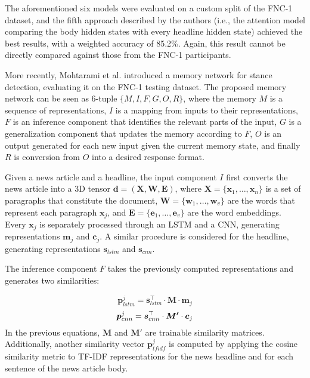 The aforementioned six models were evaluated on a custom split of the FNC-1 dataset, and the fifth approach described by the authors (i.e., the attention model comparing the body hidden states with every headline hidden state) achieved the best results, with a weighted accuracy of 85.2\%. Again, this result cannot be directly compared against those from the FNC-1 participants.

More recently, Mohtarami et al. \cite{Mohtarami2018} introduced a memory network for stance detection, evaluating it on the FNC-1 testing dataset. The proposed memory network can be seen as 6-tuple $\{M, I, F, G, O, R\}$, where the memory $M$ is a sequence of representations, $I$ is a mapping from inputs to their representations, $F$ is an inference component that identifies the relevant parts of the input, $G$ is a generalization component that updates the memory according to $F$, $O$ is an output generated for each new input given the current memory state, and finally  $R$ is conversion from $O$ into a desired response format.

Given a news article and a headline, the input component $I$ first converts the news article into a 3D tensor $\boldsymbol{d} = (\boldsymbol{X}, \boldsymbol{W}, \boldsymbol{E})$, where $\boldsymbol{X} = \{\boldsymbol{x}_1, \dots, \boldsymbol{x}_n\}$ is a set of paragraphs that constitute the document, $\boldsymbol{W} = \{\boldsymbol{w}_1, \dots, \boldsymbol{w}_v\}$ are the words that represent each paragraph $\boldsymbol{x}_j$, and $\boldsymbol{E} = \{\boldsymbol{e}_1, \dots, \boldsymbol{e}_v\}$ are the word embeddings. Every $\boldsymbol{x}_j$ is separately processed through an LSTM and a CNN, generating representations $\boldsymbol{m}_j$ and $\boldsymbol{c}_j$. A similar procedure is considered for the headline, generating representations $\boldsymbol{s}_{lstm}$ and $\boldsymbol{s}_{cnn}$.

The inference component $F$ takes the previously computed representations and generates two similarities:

\begin{equation}
\boldsymbol{p}^j_{lstm} = \boldsymbol{s}_{lstm}^\top \cdot \boldsymbol{M} \cdot \boldsymbol{m}_j
\end{equation}
\begin{equation}
\boldsymbol{p}^j_{cnn} = \boldsymbol{s}_{cnn}^\top \cdot \boldsymbol{M'} \cdot \boldsymbol{c}_j\\
\label{eq:sims}
\end{equation}
In the previous equations, $\boldsymbol{M}$ and $\boldsymbol{M'}$ are trainable similarity matrices. Additionally, another similarity vector $\boldsymbol{p}^j_{tfidf}$ is computed by applying the cosine similarity metric to TF-IDF representations for the news headline and for each sentence of the news article body.

